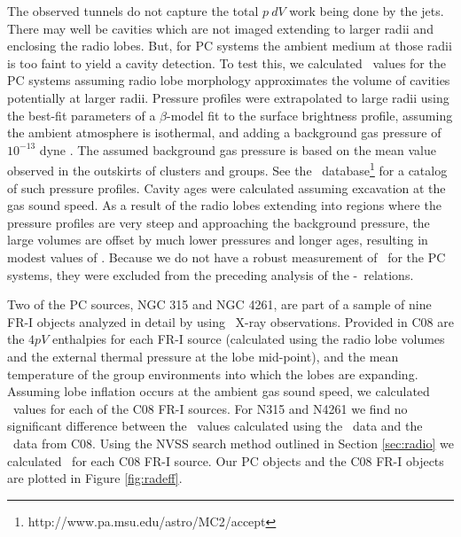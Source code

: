 \documentclass{emulateapj}
\begin{document}
The observed tunnels do not capture the total $p~dV$ work being done
by the jets. There may well be cavities which are not imaged extending
to larger radii and enclosing the radio lobes. But, for PC systems the
ambient medium at those radii is too faint to yield a cavity
detection. To test this, we calculated \pcav\ values for the PC
systems assuming radio lobe morphology approximates the volume of
cavities potentially at larger radii. Pressure profiles were
extrapolated to large radii using the best-fit parameters of a
$\beta$-model \citep{betamodel} fit to the surface brightness profile,
assuming the ambient atmosphere is isothermal, and adding a background
gas pressure of $10^{-13}$ dyne \pcmsq. The assumed background gas
pressure is based on the mean value observed in the outskirts of
clusters and groups. See the
\accept\ database\footnote{http://www.pa.msu.edu/astro/MC2/accept} for
a catalog of such pressure profiles. Cavity ages were calculated
assuming excavation at the gas sound speed. As a result of the radio
lobes extending into regions where the pressure profiles are very
steep and approaching the background pressure, the large volumes are
offset by much lower pressures and longer ages, resulting in modest
values of \pcav. Because we do not have a robust measurement of
\pcav\ for the PC systems, they were excluded from the preceding
analysis of the \pjet-\prad\ relations.

Two of the PC sources, NGC 315 and NGC 4261, are part of a sample of
nine FR-I objects analyzed in detail by \citet[][hereafter
C08]{2008MNRAS.386.1709C} using \xmm\ X-ray observations. Provided in
C08 are the $4pV$ enthalpies for each FR-I source (calculated using
the radio lobe volumes and the external thermal pressure at the lobe
mid-point), and the mean temperature of the group environments into
which the lobes are expanding. Assuming lobe inflation occurs at the
ambient gas sound speed, we calculated \pcav\ values for each of the
C08 FR-I sources. For N315 and N4261 we find no significant difference
between the \pcav\ values calculated using the \chandra\ data and the
\xmm\ data from C08. Using the NVSS search method outlined in Section
\ref{sec:radio} we calculated \phigh\ for each C08 FR-I source. Our PC
objects and the C08 FR-I objects are plotted in Figure
\ref{fig:radeff}.
\end{document}
